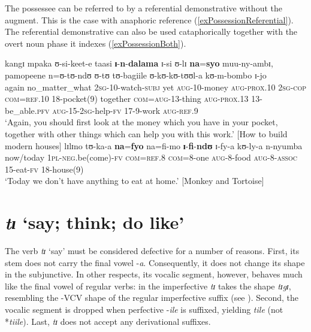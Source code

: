 The possessee can be referred to by a referential demonstrative without the augment. This is the case with anaphoric reference (\ref{exPossessionReferential}). The referential demonstrative can also be used cataphorically together with the overt noun phase it indexes (\ref{exPossessionBoth}).
\begin{exe}
\ex \label{exPossessionReferential}\gll kangɪ mpaka ʊ-si-keet-e taasi \textbf{ɪ}-\textbf{n}-\textbf{dalama} ɪ-si ʊ-lɪ \textbf{na}=\textbf{syo} muu-ny-ambɪ, pamopeene n=ʊ-tʊ-ndʊ ʊ-tʊ tʊ-bagiile ʊ-kʊ-kʊ-tʊʊl-a kʊ-m-bombo ɪ-jo\\
again no\_matter\_what \textsc{2sg}-10-watch-\textsc{subj} yet \textsc{aug}-10-money \textsc{aug}-\textsc{prox.10} \textsc{2sg}-\textsc{cop} \textsc{com}=\textsc{ref.10} 18-pocket(9) together \textsc{com}=\textsc{aug}-13-thing \textsc{aug}-\textsc{prox.13} 13-be\_able.\textsc{pfv} \textsc{aug}-15-\textsc{2sg}-help-\textsc{fv} 17-9-work \textsc{aug}-\textsc{ref.9}\\
\glt `Again, you should first look at the money which you have in your pocket, together with other things which can help you with this work.' [How to build modern houses]
\ex\label{exPossessionBoth} \gll lɪlɪno tʊ-ka-a \textbf{na}=\textbf{fyo} na=fi-mo \textbf{ɪ}-\textbf{fi}-\textbf{ndʊ} ɪ-fy-a kʊ-ly-a n-nyumba\\
now/today \textsc{1pl}-\textsc{neg}.be(come)-\textsc{fv} \textsc{com}=\textsc{ref.8} \textsc{com}=8-one \textsc{aug}-8-food \textsc{aug}-8-\textsc{assoc} 15-eat-\textsc{fv} 18-house(9)\\
\glt `Today we don't have anything to eat at home.' [Monkey and Tortoise]
\end{exe} 
\section{\textit{tɪ} `say; think; do like'}\label{defectiveti} 
The verb \textit{tɪ} \lq say' must be considered defective for a number of reasons. First, its stem does not carry the final vowel -\textit{a}. Consequently, it does not change its shape in the subjunctive. In other respects, its vocalic segment, however, behaves much like the final vowel of regular verbs: in the imperfective \textit{tɪ} takes the shape \textit{tɪgɪ}, resembling the -VCV shape of the regular imperfective suffix (see ). Second, the vocalic segment is dropped when perfective -\textit{ile} is suffixed, yielding \textit{tile} (not *\textit{tiile}). Last, \textit{tɪ} does not accept any derivational suffixes.

